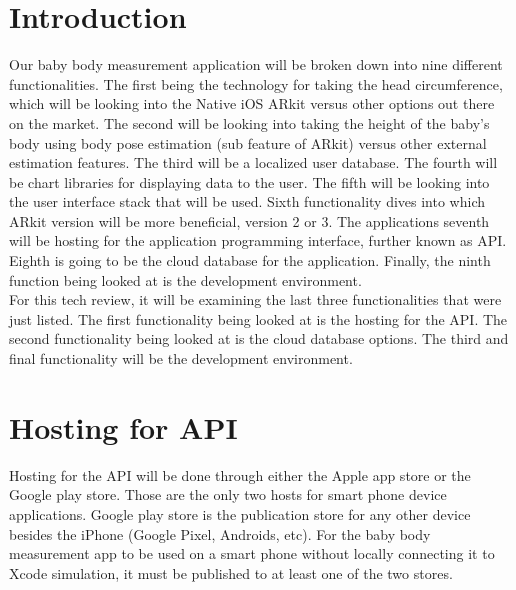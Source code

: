 \documentclass[letterpaper,10pt,draftclsnofoot,onecolumn,compsoc]{IEEEtran}
\begin{document}
\section{Introduction}
\begin{singlespace}
\noindent
Our baby body measurement application will be broken down into nine different functionalities. The first being the technology for taking the head circumference, which will be looking into the Native iOS ARkit versus other options out there on the market. The second will be looking into taking the height of the baby's body using body pose estimation (sub feature of ARkit) versus other external estimation features. The third will be a localized user database. The fourth will be chart libraries for displaying data to the user. The fifth will be looking into the user interface stack that will be used. Sixth functionality dives into which ARkit version will be more beneficial, version 2 or 3. The applications seventh will be hosting for the application programming interface, further known as API. Eighth is going to be the cloud database for the application. Finally, the ninth function being looked at is the development environment.\\ 

For this tech review, it will be examining the last three functionalities that were just listed. The first functionality being looked at is the hosting for the API. The second functionality being looked at is the cloud database options. The third and final functionality will be the development environment.
\end{singlespace}





\section{Hosting for API}
\begin{singlespace}

Hosting for the API will be done through either the Apple app store or the Google play store. Those are the only two hosts for smart phone device applications. Google play store is the publication store for any other device besides the iPhone (Google Pixel, Androids, etc). For the baby body measurement app to be used on a smart phone without locally connecting it to Xcode simulation, it must be published to at least one of the two stores.
\end{singlespace}
\end{document}
